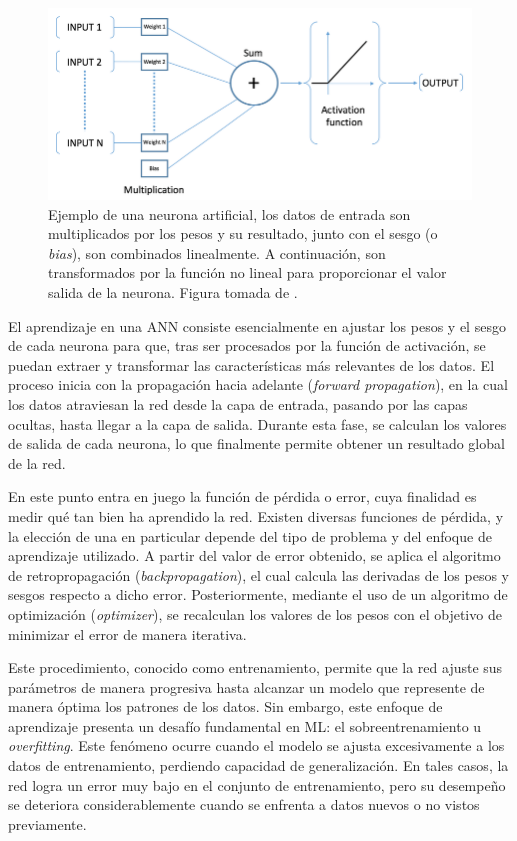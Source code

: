 \begin{figure}[h]
    \centering
    \includegraphics[width=\linewidth]{figures/2_theory/artificialNeuron.png}
    \caption[Ejemplo de una neurona artificial]{Ejemplo de una neurona artificial, los datos de entrada son multiplicados por los pesos y su resultado, junto con el sesgo (o \textit{bias}), son combinados linealmente. A continuación, son transformados por la función no lineal para proporcionar el valor salida de la neurona. Figura tomada de \cite{artificialNeuron}.}
    \label{fig:artificialNeuronExample}
\end{figure}

El aprendizaje en una ANN consiste esencialmente en ajustar los pesos y el sesgo de cada neurona para que, tras ser procesados por la función de activación, se puedan extraer y transformar las características más relevantes de los datos. El proceso inicia con la propagación hacia adelante (\textit{forward propagation}), en la cual los datos atraviesan la red desde la capa de entrada, pasando por las capas ocultas, hasta llegar a la capa de salida. Durante esta fase, se calculan los valores de salida de cada neurona, lo que finalmente permite obtener un resultado global de la red.

En este punto entra en juego la función de pérdida o error, cuya finalidad es medir qué tan bien ha aprendido la red. Existen diversas funciones de pérdida, y la elección de una en particular depende del tipo de problema y del enfoque de aprendizaje utilizado. A partir del valor de error obtenido, se aplica el algoritmo de retropropagación (\textit{backpropagation}), el cual calcula las derivadas de los pesos y sesgos respecto a dicho error. Posteriormente, mediante el uso de un algoritmo de optimización (\textit{optimizer}), se recalculan los valores de los pesos con el objetivo de minimizar el error de manera iterativa.

Este procedimiento, conocido como entrenamiento, permite que la red ajuste sus parámetros de manera progresiva hasta alcanzar un modelo que represente de manera óptima los patrones de los datos. Sin embargo, este enfoque de aprendizaje presenta un desafío fundamental en ML: el sobreentrenamiento u \textit{overfitting}. Este fenómeno ocurre cuando el modelo se ajusta excesivamente a los datos de entrenamiento, perdiendo capacidad de generalización. En tales casos, la red logra un error muy bajo en el conjunto de entrenamiento, pero su desempeño se deteriora considerablemente cuando se enfrenta a datos nuevos o no vistos previamente.

